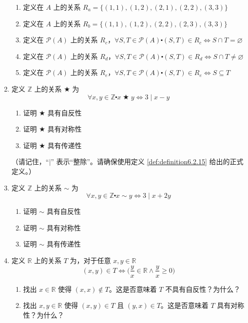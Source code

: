 \begin{enumerate}[label=(\arabic*)]
    \begin{enumerate}[label=(\alph*)]
        \item 定义在 $A$ 上的关系 $R_a = \{(1, 1),(1, 2),(2, 1),(2, 2),(3, 3)\}$
        \item 定义在 $A$ 上的关系 $R_b = \{(1, 1),(1, 2),(2, 2),(2, 3),(3, 3)\}$
        \item 定义在 $\mathcal{P}(A)$ 上的关系 $R_c$，$\forall S, T \in \mathcal{P}(A) \centerdot (S, T) \in R_c \iff S \cap T = \varnothing$
        \item 定义在 $\mathcal{P}(A)$ 上的关系 $R_d$，$\forall S, T \in \mathcal{P}(A) \centerdot (S, T) \in R_d \iff S \cap T \ne \varnothing$
        \item 定义在 $\mathcal{P}(A)$ 上的关系 $R_e$，$\forall S, T \in \mathcal{P}(A) \centerdot (S, T) \in R_e \iff S \subseteq T$
    \end{enumerate}
    \item 定义 $\mathbb{Z}$ 上的关系 $\bigstar$ 为
    \[\forall x, y \in \mathbb{Z} \centerdot x \;\bigstar\; y \iff 3 \mid x - y\]
    \begin{enumerate}[label=(\alph*)]
        \item 证明 $\bigstar$ 具有自反性
        \item 证明 $\bigstar$ 具有对称性
        \item 证明 $\bigstar$ 具有传递性
    \end{enumerate}
    （请记住，``$\mid$'' 表示``整除''。请确保使用定义 \ref{def:definition6.2.15} 给出的正式定义。）
    \item 定义 $\mathbb{Z}$ 上的关系 $\sim$ 为
    \[\forall x, y \in \mathbb{Z} \centerdot x \sim y \iff 3 \mid x + 2y\]
    \begin{enumerate}[label=(\alph*)]
        \item 证明 $\sim$ 具有自反性
        \item 证明 $\sim$ 具有对称性
        \item 证明 $\sim$ 具有传递性
    \end{enumerate}
    \item 定义 $\mathbb{R}$ 上的关系 $T$ 为，对于任意 $x, y \in \mathbb{R}$
    \[(x, y) \in T \iff \Big(\frac{y}{x} \in \mathbb{R} \land \frac{y}{x} \ge 0\Big)\]
    \begin{enumerate}[label=(\alph*)]
        \item 找出 $x \in \mathbb{R}$ 使得 $(x,x) \notin T$。这是否意味着 $T$ 不具有自反性？为什么？
        \item 找出 $x,y \in \mathbb{R}$ 使得 $(x,y) \in T$ 且 $(y,x) \in T$。这是否意味着 $T$ 具有对称性？为什么？

\end{enumerate}
\end{enumerate}
